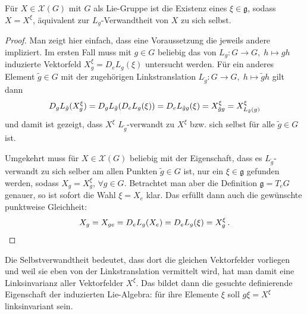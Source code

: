 \documentclass[../H_Analysis_main.tex]{subfiles}
\begin{document}
\begin{satz}[Linksinvarianz]\label{satz:linksinvvektf}
Für $X \in \mathcal{X}(G)$ mit $G$ als Lie-Gruppe ist die Existenz eines $\xi \in \mathfrak{g}$, sodass $X = X^\xi$, äquivalent zur $L_g$-Verwandtheit von $X$ zu sich selbst.
\end{satz}
\begin{proof}
Man zeigt hier einfach, dass eine Voraussetzung die jeweils andere impliziert. Im ersten Fall muss mit $g \in G$ beliebig das von $L_g: G \rightarrow G, \; h \mapsto gh$ induzierte Vektorfeld $X^\xi_g = D_e L_g(\xi)$ untersucht werden. Für ein anderes Element $\tilde{g} \in G$ mit der zugehörigen Linkstranslation $L_{\tilde{g}}: G \rightarrow G, \; h \mapsto \tilde{g} h$ gilt dann
\begin{equation*}
D_g L_{\tilde{g}}(X^\xi_g) = D_g L_{\tilde{g}} \qty(D_e L_g(\xi)) = D_e L_{\tilde{g} g}(\xi) = X^\xi_{\tilde{g} g} = X^\xi_{L_{\tilde{g}}(g)}
\end{equation*}
und damit ist gezeigt, dass $X^\xi$ $L_{\tilde{g}}$-verwandt zu $X^\xi$ bzw. sich selbst für alle $\tilde{g} \in G$ ist.

Umgekehrt muss für $X \in \mathcal{X}(G)$ beliebig mit der Eigenschaft, dass es $L_{\tilde{g}}$-verwandt zu sich selber am allen Punkten $\tilde{g} \in G$ ist, nur ein $\xi \in \mathfrak{g}$ gefunden werden, sodass $X_g = X^\xi_g, \, \forall g \in G$. Betrachtet man aber die Definition $\mathfrak{g} = T_e G$ genauer, so ist sofort die Wahl $\xi = X_e$ klar. Das erfüllt dann auch die gewünschte punktweise Gleichheit:
\begin{equation*}
X_g = X_{g e} = D_e L_g(X_e) = D_e L_g(\xi) = X^\xi_g \, . \qedhere
\end{equation*}
\end{proof}
Die Selbstverwandtheit bedeutet, dass dort die gleichen Vektorfelder vorliegen und weil sie eben von der Linkstranslation vermittelt wird, hat man damit eine Linksinvarianz aller Vektorfelder $X^\xi$. Das bildet dann die gesuchte definierende Eigenschaft der induzierten Lie-Algebra: für ihre Elemente $\xi$ soll $g\xi = X^\xi$ linksinvariant sein.
\end{document}
